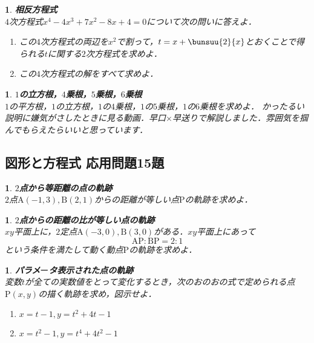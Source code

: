 \documentclass[10pt,
fleqn,
dvipdfmx,
uplatex
]{jsarticle}
\newtheorem{question}[Question]{}
\begin{document}
\begin{question}{\bf\boldmath 相反方程式}\\
$4$次方程式$x^4-4x^3+7x^2-8x+4=0$について次の問いに答えよ．
\begin{enumerate}
\item この$4$次方程式の両辺を$x^2$で割って，$t=x+\bunsuu{2}{x}$とおくことで得られる$t$に関する$2$次方程式を求めよ．
\item この$4$次方程式の解をすべて求めよ．
\end{enumerate}

\end{question}



\begin{question}{\bf\boldmath $1$の立方根，$4$乗根，$5$乗根，$6$乗根}\\
$1$の平方根，$1$の立方根，$1$の$4$乗根，$1$の$5$乗根，$1$の$6$乗根を求めよ．
かったるい説明に嫌気がさしたときに見る動画．早口$×$早送りで解説しました．雰囲気を掴んでもらえたらいいと思っています．
\end{question}

\subsection{図形と方程式 応用問題15題}



\begin{question}{\bf\boldmath $2$点から等距離の点の軌跡}\\
$2$点$\text{A}\left(-1,3\right), \text{B}\left(2,1\right)$からの距離が等しい点$\text{P}$の軌跡を求めよ．
\end{question}



\begin{question}{\bf\boldmath $2$点からの距離の比が等しい点の軌跡}\\
$xy$平面上に，$2$定点$\text{A}\left(-3,0\right), \text{B}\left(3,0\right)$がある．$xy$平面上にあって
\[\text{AP}:\text{BP}=2:1\]
という条件を満たして動く動点$\text{P}$の軌跡を求めよ．
\end{question}



\begin{question}{\bf\boldmath パラメ$ー$タ表示された点の軌跡}\\
変数$t$が全ての実数値をとって変化するとき，次のおのおの式で定められる点$\text{P}\left(x,y\right)$の描く軌跡を求め，図示せよ．
\begin{enumerate}
\item $x=t-1,y=t^2+4t-1$
\item $x=t^2-1,y=t^4+4t^2-1$
\end{enumerate}

\end{question}
\end{document}
